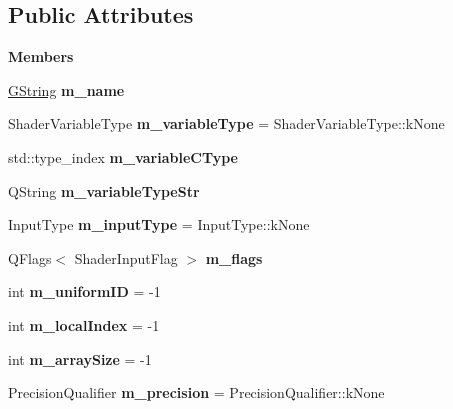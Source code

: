 \subsection*{Public Attributes}
\begin{Indent}\textbf{ Members}\par
\begin{DoxyCompactItemize}
\item 
\mbox{\label{structrev_1_1_shader_input_info_a43ab2680f94bb2bdfbca0cfe65199231}} 
\mbox{\hyperlink{classrev_1_1_g_string}{G\+String}} {\bfseries m\+\_\+name}
\item 
\mbox{\label{structrev_1_1_shader_input_info_ac73fbe1e6a9bd891aeadd9558243398c}} 
Shader\+Variable\+Type {\bfseries m\+\_\+variable\+Type} = Shader\+Variable\+Type\+::k\+None
\item 
\mbox{\label{structrev_1_1_shader_input_info_a94a7a71933e469c347af2db838320bba}} 
std\+::type\+\_\+index {\bfseries m\+\_\+variable\+C\+Type}
\item 
\mbox{\label{structrev_1_1_shader_input_info_a7befac0cadcc54f29cc414aec39a0176}} 
Q\+String {\bfseries m\+\_\+variable\+Type\+Str}
\item 
\mbox{\label{structrev_1_1_shader_input_info_a75486c198dd1d90b6ca46ebbf6e6166a}} 
Input\+Type {\bfseries m\+\_\+input\+Type} = Input\+Type\+::k\+None
\item 
\mbox{\label{structrev_1_1_shader_input_info_aba718a705f6f167711995a4f6a6b46e9}} 
Q\+Flags$<$ Shader\+Input\+Flag $>$ {\bfseries m\+\_\+flags}
\item 
\mbox{\label{structrev_1_1_shader_input_info_ab910f7afc77d76ce8faf26e3cf75b366}} 
int {\bfseries m\+\_\+uniform\+ID} = -\/1
\item 
\mbox{\label{structrev_1_1_shader_input_info_ad3cd075b0abf462bd28437378108188a}} 
int {\bfseries m\+\_\+local\+Index} = -\/1
\item 
\mbox{\label{structrev_1_1_shader_input_info_a07c60644b5f5d6d7f149c57b70eb4db4}} 
int {\bfseries m\+\_\+array\+Size} = -\/1
\item 
\mbox{\label{structrev_1_1_shader_input_info_a473f2e3b49f87edde2dea4bcfefe72d7}} 
Precision\+Qualifier {\bfseries m\+\_\+precision} = Precision\+Qualifier\+::k\+None
\end{DoxyCompactItemize}
\end{Indent}
